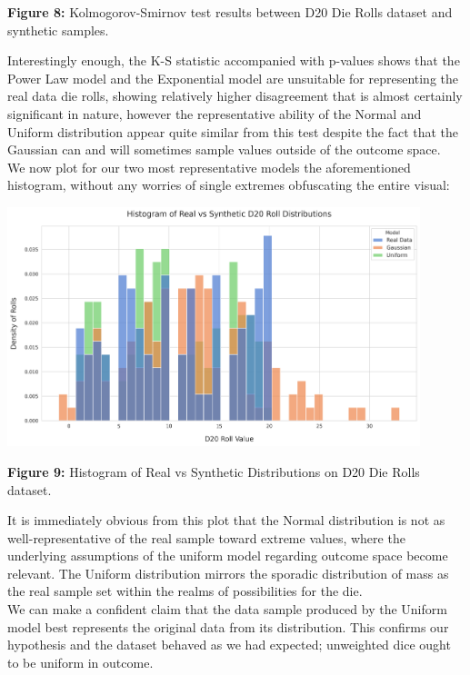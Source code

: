 \begin{center}
\textbf{Figure 8:} Kolmogorov-Smirnov test results between D20 Die Rolls dataset and synthetic samples.
\end{center}

Interestingly enough, the K-S statistic accompanied with p-values shows that the Power Law model and the Exponential model are unsuitable for representing the real data die rolls, showing relatively higher disagreement that is almost certainly significant in nature, however the representative ability of the Normal and Uniform distribution appear quite similar from this test despite the fact that the Gaussian can and will sometimes sample values outside of the outcome space.\\

We now plot for our two most representative models the aforementioned histogram, without any worries of single extremes obfuscating the entire visual:

\begin{center}
  \includegraphics[width=0.90\textwidth]{figures/uniform/histogram.png}
  
  \textbf{Figure 9:} Histogram of Real vs Synthetic Distributions on D20 Die Rolls dataset.
\end{center}

It is immediately obvious from this plot that the Normal distribution is not as well-representative of the real sample toward extreme values, where the underlying assumptions of the uniform model regarding outcome space become relevant. The Uniform distribution mirrors the sporadic distribution of mass as the real sample set within the realms of possibilities for the die.\\

We can make a confident claim that the data sample produced by the Uniform model best represents the original data from its distribution. This confirms our hypothesis and the dataset behaved as we had expected; unweighted dice ought to be uniform in outcome.
